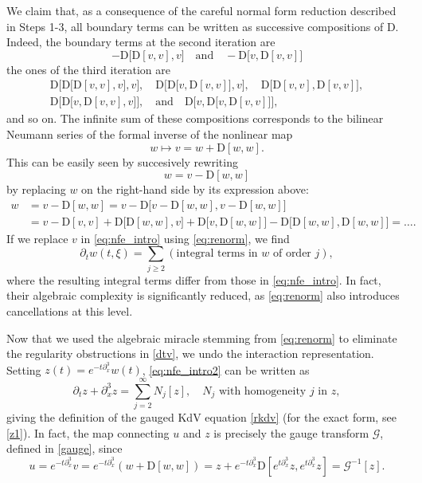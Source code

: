\documentclass[a4paper,
11pt,  reqno]{amsart}
\newcommand{\5}{\textup{V}}
\newcommand{\dx}{\partial_x}
\newcommand{\dt}{\partial_t}
\theoremstyle{remark}
\newcommand{\Gc}{\mathcal{G}}
\numberwithin{equation}{section}
\numberwithin{theorem}{section}
\newcommand{\D}{\mathrm{D}}
\begin{document}
	We claim that, as a consequence of the careful normal form reduction described in Steps 1-3, all boundary terms can be written as successive compositions of $\D$. Indeed, the boundary terms at the second iteration are
	$$
	-\D\big[\D[v,v],v\big]
\quad 
\text{and}
\quad 
-\D\big[v,\D[v,v]\big]
	$$
	the ones of the third iteration are
\begin{gather}
\D\Big[\D\big[\D[v,v],v\big],v\Big],
\quad \D\Big[\D\big[v,\D[v,v]\big],v\Big],
\quad \D\big[\D[v,v],\D[v,v]\big],
\\
\D\Big[\D\big[v, \D[v,v],v\big]\Big],\quad
\text{and}
\quad  \D\Big[v,\D\big[v,\D[v,v]\big]\Big],
\end{gather}
	and so on. The infinite sum of these compositions corresponds to the bilinear Neumann series of the formal inverse of the nonlinear map
\begin{equation}\label{eq:renorm}
		w\mapsto v=w+\D[w,w].
	\end{equation}
    This can be easily seen by succesively rewriting
	$$
	w=v-\D[w,w]
	$$
by replacing $w$ on the right-hand side by its expression above:
	\begin{align}
		w
&=v-\D[w,w]=v-\D\big[v-\D[w,w],v-\D[w,w]\big]
\\
&=v-\D[v,v]+\D\big[\D[w,w],v\big]+\D\big[v,\D[w,w]\big]-\D\big[\D[w,w],\D[w,w]\big]=\dots.
	\end{align}
	If we replace $v$ in \eqref{eq:nfe_intro} using \eqref{eq:renorm}, we find
	\begin{equation}\label{eq:nfe_intro2}
		\dt \widehat{w}(t,\xi)= \sum_{j\ge 2} (\mbox{integral terms in }w\mbox{ of order }j), 
	\end{equation}
where the resulting integral terms differ from those in \eqref{eq:nfe_intro}. In fact, their algebraic complexity is significantly reduced, as \eqref{eq:renorm} also introduces cancellations at this level. 


    Now that {we used the algebraic miracle stemming from \eqref{eq:renorm} to} eliminate the regularity obstructions in \eqref{dtv}, we undo the interaction representation. Setting $z(t)=e^{-t\partial_x^3}w(t)$, \eqref{eq:nfe_intro2} can be written as
    \begin{equation}\label{eq:z_intro_2}
\dt z + \dx^3 z = \sum_{j= 2}^\infty N_j[z],\quad N_j\mbox{ with homogeneity }j \mbox{ in }z, 
    \end{equation}
    giving the definition of the gauged KdV equation \eqref{rkdv} (for the exact form, see \eqref{z1}).
In fact, 
    the map connecting  $u$ and $z$  is precisely the gauge transform $\Gc$, defined in \eqref{gauge}, since
    \begin{equation}
u=e^{-t\dx^3}v= e^{-t\dx^3}\left(w+\D[w,w]\right)= z + e^{-t\dx^3}\D[e^{t\dx^3}z, e^{t\dx^3}z] = \Gc^{-1}[z].
    \end{equation}
\end{document}
